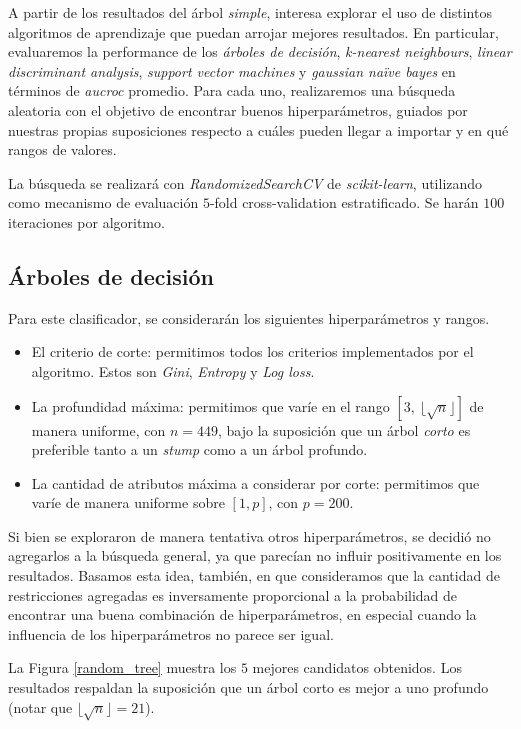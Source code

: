 A partir de los resultados del árbol \textit{simple}, interesa explorar el uso de distintos algoritmos de aprendizaje que puedan arrojar mejores resultados. En particular, evaluaremos la performance de los \textit{árboles de decisión}, \textit{k-nearest neighbours}, \textit{linear discriminant analysis}, \textit{support vector machines} y \textit{gaussian naïve bayes} en términos de \textit{aucroc} promedio. Para cada uno, realizaremos una búsqueda aleatoria con el objetivo de encontrar buenos hiperparámetros, guiados por nuestras propias suposiciones respecto a cuáles pueden llegar a importar y en qué rangos de valores.

La búsqueda se realizará con \textit{RandomizedSearchCV} de \textit{scikit-learn}, utilizando como mecanismo de evaluación $5$-fold cross-validation estratificado. Se harán $100$ iteraciones por algoritmo.

\subsection{Árboles de decisión}
Para este clasificador, se considerarán los siguientes hiperparámetros y rangos. 

\begin{itemize}
    \item El criterio de corte: permitimos todos los criterios implementados por el algoritmo. Estos son \textit{Gini}, \textit{Entropy} y \textit{Log loss}. 
    \item La profundidad máxima: permitimos que varíe en el rango $[3,\ \lfloor\sqrt{n} \rfloor]$ de manera uniforme, con $n=449$, bajo la suposición que un árbol \textit{corto} es preferible tanto a un \textit{stump} como a un árbol profundo.
    \item La cantidad de atributos máxima a considerar por corte: permitimos que varíe de manera uniforme sobre $[1, p]$, con $p = 200$.
\end{itemize}

Si bien se exploraron de manera tentativa otros hiperparámetros, se decidió no agregarlos a la búsqueda general, ya que parecían no influir positivamente en los resultados. Basamos esta idea, también, en que consideramos que la cantidad de restricciones agregadas es inversamente proporcional a la probabilidad de encontrar una buena combinación de hiperparámetros, en especial cuando la influencia de los hiperparámetros no parece ser igual. 

La Figura \ref{random_tree} muestra los $5$ mejores candidatos obtenidos. Los resultados respaldan la suposición que un árbol corto es mejor a uno profundo (notar que $\lfloor\sqrt{n} \rfloor = 21$).

